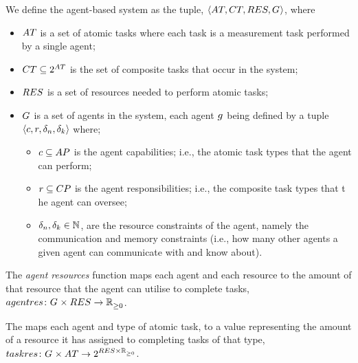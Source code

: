 We define the agent-based system as the tuple, $\langle 
	\setAtomicTask{}{},
	\setCompositeTask{}{},
	\setResource{}{},
	\setAgents{}{}
\rangle$, where
\begin{itemize}
	\item $\setAtomicTask{}{}$ is a set of atomic tasks where each task is a measurement task performed by a single agent;
	\item $\setCompositeTask{}{} \subseteq \powerSetSymbol{\setAtomicTask{}{}}{}{}$ is the set of composite tasks that occur in the system;
	\item $\setResource{}{}$ is a set of resources needed to perform atomic tasks;
	\item $G_{}^{}$ is a set of agents in the system, each agent $g_{}^{}$ being defined by a tuple $\langle c,r, \delta_n, \delta_k \rangle$ where;
	\begin{itemize}
		\item $\varAgentCapability{}{}\subseteq \setAtomicTaskType{}{}$ is the agent capabilities; i.e., the atomic task types that the agent can perform;
		 \item $\varAgentResponsiblity{}{} \subseteq \setCompositeTaskType{}{}$ is the agent responsibilities; i.e., the composite task types that t    he agent can oversee;
		\item $\delta_n, \delta_k \in \mathbb{N}$, are the resource constraints of the agent, namely the communication and memory constraints (i.e., how many other agents a given agent can communicate with and know about).
	\end{itemize}
\end{itemize}




\newcommand{\formalAgentResources}[2]{
	\functionFormal{agentres}
	{\setAgents{}{} \times \setResource{}{}}
	{\setRealNumbersNonNegative{}{}}
}
\newcommand{\functionAgentResources}[2]{
	\functionSignature{agentres}{\varAgent{}{}, \varResource{}{}}
}
The \textit{agent resources} function maps each agent and each resource to the amount of that resource that the agent can utilise to complete tasks, $\formalAgentResources{}{}$.

\newcommand{\formalTaskResourceAllocation}[2]{
	\functionFormal{taskres}
	{\setAgents{}{} \times \setAtomicTask{}{}}
	{\powerSetSymbol{\setResource{}{} \times \setRealNumbersNonNegative{}  {}}{}{}}
}
\newcommand{\functionTaskResourceAllocation}[2]{
	\functionSignature{taskres}
	{\varAgent{}{}, \varAtomicTask{}{}}
}
The  maps each agent and type of atomic task, to a value representing the amount of a resource it has assigned to completing tasks of that type, $\formalTaskResourceAllocation{}{}$.

